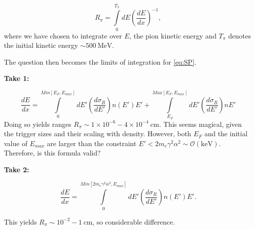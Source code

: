 \documentclass[11 pt, preprint,preprintnumbers,amsmath,amssymb, prd]{revtex4}
\begin{document}
\begin{equation}
R_\pi = \int \limits_{0}^{T_\pi} dE \left(\frac{dE}{dx}\right)^{-1},
\end{equation}
where we have chosen to integrate over $E$, the pion kinetic energy and $T_\pi$ denotes the initial kinetic energy $\sim 500 ~\text{MeV}$. 

The question then becomes the limits of integration for \ref{eq:SP}. 

\textbf{Take 1:}

\begin{equation}
\frac{dE}{dx} = \int \limits_{0}^{Min[E_F, E_{max}]} dE' \left(\frac{d \sigma_R}{dE'}\right) n(E') E' + \int \limits_{E_F}^{Max[E_F, E_{max}]} dE' \left(\frac{d \sigma_R}{dE'}\right) n E' 
\end{equation}
Doing so yields ranges $R_\pi \sim 1 \times 10^{-6} - 4 \times 10^{-4} ~\text{cm}$. This seems magical, given the trigger sizes and their scaling with density. However, both $E_F$ and the initial value of $E_{max}$ are larger than the constraint $E' < 2 m_e \gamma^2 \alpha^2 \sim \mathcal{O}(\text{keV})$. Therefore, is this formula valid?

\textbf{Take 2:}

\begin{equation}
\frac{dE}{dx} = \int \limits_{0}^{Min[2 m_e \gamma^2 \alpha^2, E_{max}]} dE' \left(\frac{d \sigma_R}{dE'}\right) n(E') E'. 
\end{equation}

This yields $R_\pi \sim 10^{-2} - 1 ~\text{cm}$, so considerable difference. 
\end{document}
